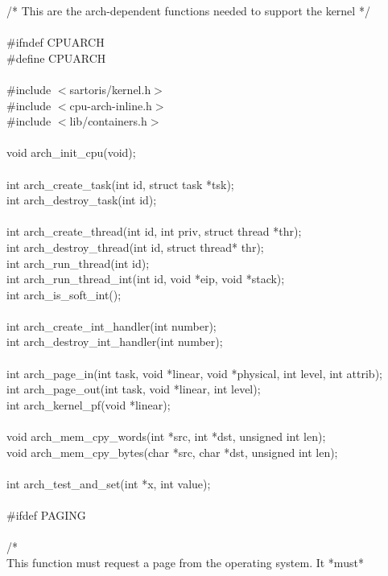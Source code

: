 \documentclass[11pt, letterpaper, twoside, english]{book}
\begin{document}
\begin{sf} \noindent /* This are the arch-dependent functions needed to support the kernel */ \\
\\
\#ifndef CPUARCH \\
\#define CPUARCH \\
\\
\#include $<$sartoris/kernel.h$>$ \\
\#include $<$cpu-arch-inline.h$>$\\
\#include $<$lib/containers.h$>$\\
\\
void arch\_init\_cpu(void);\\
\\
int arch\_create\_task(int id, struct task *tsk);\\
int arch\_destroy\_task(int id);\\
\\
int arch\_create\_thread(int id, int priv, struct thread *thr);\\
int arch\_destroy\_thread(int id, struct thread* thr);\\
int arch\_run\_thread(int id);\\
int arch\_run\_thread\_int(int id, void *eip, void *stack);\\
int arch\_is\_soft\_int();\\
\\
int arch\_create\_int\_handler(int number);\\
int arch\_destroy\_int\_handler(int number);\\
\\
int arch\_page\_in(int task, void *linear, void *physical, int level, int attrib);\\
int arch\_page\_out(int task, void *linear, int level);\\
int arch\_kernel\_pf(void *linear);\\
\\
void arch\_mem\_cpy\_words(int *src, int *dst, unsigned int len);\\
void arch\_mem\_cpy\_bytes(char *src, char *dst, unsigned int len);\\
\\
int arch\_test\_and\_set(int *x, int value);\\
\\
\#ifdef PAGING\\
\\
/*\\
This function must request a page from the operating system. It *must*\\

\end{sf}
\end{document}
